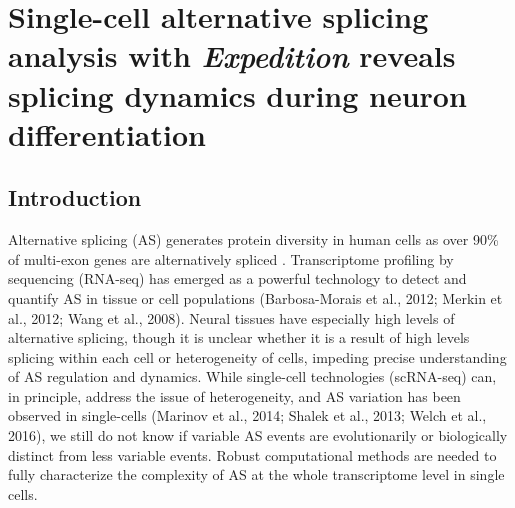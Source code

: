 \chapter{Single-cell alternative splicing analysis with \emph{Expedition} reveals splicing dynamics during neuron differentiation}


\section{Introduction}
Alternative splicing (AS) generates protein diversity in human cells as over 90\% of multi-exon genes are alternatively spliced \cite{Johnson:2003kh,Pan:2008jq,Takeda:2009gl,Wang:2008gt}. Transcriptome profiling by sequencing (RNA-seq) has emerged as a powerful technology to detect and quantify AS in tissue or cell populations (Barbosa-Morais et al., 2012; Merkin et al., 2012; Wang et al., 2008). Neural tissues have especially high levels of alternative splicing, though it is unclear whether it is a result of high levels splicing within each cell or heterogeneity of cells, impeding precise understanding of AS regulation and dynamics. While single-cell technologies (scRNA-seq) can, in principle, address the issue of heterogeneity, and AS variation has been observed in single-cells (Marinov et al., 2014; Shalek et al., 2013; Welch et al., 2016), we still do not know if variable AS events are evolutionarily or biologically distinct from less variable events. Robust computational methods are needed to fully characterize the complexity of AS at the whole transcriptome level in single cells.
